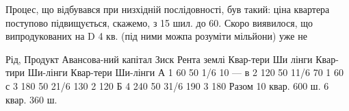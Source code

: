 Процес, що відбувався при низхідній послідовності, був такий: ціна квартера
поступово підвищується, скажемо, з 15 шил. до 60. Скоро виявилося, що
випродукованих на D 4 кв. (під ними можпа розуміти мільйони) уже не

Рід, Продукт        Авансова-ний капітал    Зиск    Рента
землі    Квар-тери    Ши  лінги        Квар-тири    Ши-лінги    Квар-тери    Ши-лінги
А    1    60    50    1/6    10 —
в    2    120    50    11/6    70    1    60
с    3    180    50    21/6    130    2    120
Б    4    240    50    31/6    190    3    180
Разом 10 квар. 600 ш.                6 квар. 360 ш.
